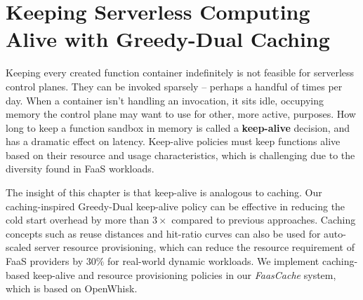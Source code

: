 \chapter{Keeping Serverless Computing Alive with Greedy-Dual Caching}
\label{chap:faascache}

Keeping every created function container indefinitely is not feasible for serverless control planes.
They can be invoked sparsely -- perhaps a handful of times per day.
When a container isn't handling an invocation, it sits idle, occupying memory the control plane may want to use for other, more active, purposes.
How long to keep a function sandbox in memory is called a \textbf{keep-alive} decision, and has a dramatic effect on latency.
Keep-alive policies must keep functions alive based on their resource and usage characteristics, which is challenging due to the diversity found in FaaS workloads.

The insight of this chapter is that keep-alive is analogous to caching.
Our caching-inspired Greedy-Dual keep-alive policy can be effective in reducing the cold start overhead by more than $3\times$ compared to previous approaches.
Caching concepts such as reuse distances and hit-ratio curves can also be used for auto-scaled server resource provisioning, which can reduce the resource requirement of FaaS providers by $30\%$ for real-world dynamic workloads.
We implement caching-based keep-alive and resource provisioning policies in our \emph{FaasCache} system, which is based on OpenWhisk.

